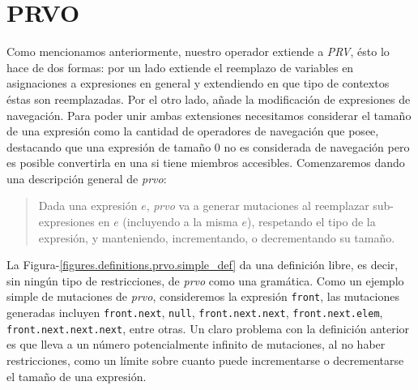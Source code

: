 \section{PRVO}
\label{sec:prvo.prvo}

Como mencionamos anteriormente, nuestro operador extiende a \emph{PRV}, \'esto lo hace de dos formas: por un lado extiende el reemplazo de variables en asignaciones a expresiones en general y extendiendo en que tipo de contextos \'estas son reemplazadas. Por el otro lado, a\~nade la modificaci\'on de expresiones de navegaci\'on. Para poder unir ambas extensiones necesitamos considerar el tama\~no de una expresi\'on como la cantidad de operadores de navegaci\'on que posee, destacando que una expresi\'on de tama\~no 0 no es considerada de navegaci\'on pero es posible convertirla en una si tiene miembros accesibles. Comenzaremos dando una descripci\'on general de \emph{prvo}:

\begin{quote}
	Dada una expresi\'on $e$, \emph{prvo} va a generar mutaciones al reemplazar sub-expresiones en $e$ (incluyendo a la misma $e$), respetando el tipo de la expresi\'on, y manteniendo, incrementando, o decrementando su tama\~no.
\end{quote}
La Figura-\ref{figures.definitions.prvo.simple_def} da una definici\'on libre, es decir, sin ning\'un tipo de restricciones, de \emph{prvo} como una gram\'atica. Como un ejemplo simple de mutaciones de \emph{prvo}, consideremos la expresi\'on \texttt{front}, las mutaciones generadas incluyen \texttt{front.next}, \texttt{null}, \texttt{front.next.next}, \texttt{front.next.elem}, \texttt{front.next.next.next}, entre otras. Un claro problema con la definici\'on anterior es que lleva a un n\'umero potencialmente infinito de mutaciones, al no haber restricciones, como un l\'imite sobre cuanto puede incrementarse o decrementarse el tama\~no de una expresi\'on.

